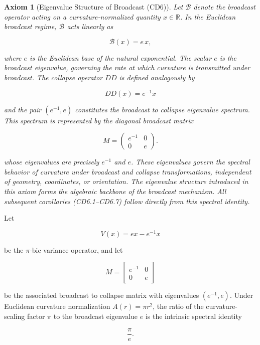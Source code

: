 \documentclass[final,onefignum,onetabnum]{siamart}
\newtheorem{axiom}{Axiom}
\begin{document}
\begin{axiom}[Eigenvalue Structure of Broadcast (CD6)]
Let $\mathcal{B}$ denote the broadcast operator acting on a curvature-normalized quantity $x \in \mathbb{R}$. In the Euclidean broadcast regime, $\mathcal{B}$ acts linearly as

\[
\mathcal{B}(x) = e\,x,
\]

where $e$ is the Euclidean base of the natural exponential. The scalar $e$ is the broadcast eigenvalue, governing the rate at which curvature is transmitted under broadcast. The collapse operator $DD$ is defined analogously by


\[
DD(x) = e^{-1} x
\]


and the pair $(e^{-1}, e)$ constitutes the broadcast to collapse eigenvalue spectrum. This spectrum is represented by the diagonal broadcast matrix


\[
M = \begin{pmatrix}
e^{-1} & 0 \\
0 & e
\end{pmatrix}.
\]


whose eigenvalues are precisely $e^{-1}$ and $e$. These eigenvalues govern the spectral behavior of curvature under broadcast and collapse transformations, independent of geometry, coordinates, or orientation. The eigenvalue structure introduced in this axiom forms the algebraic backbone of the broadcast mechanism. All subsequent corollaries (CD6.1–CD6.7) follow directly from this spectral identity.
\end{axiom}

\begin{corollary}
Let


\[
V(x) = e x - e^{-1} x
\]


be the $\pi$-bic variance operator, and let


\[
M =
\begin{bmatrix}
e^{-1} & 0 \\
0 & e
\end{bmatrix}
\]


be the associated broadcast to collapse matrix with eigenvalues $(e^{-1}, e)$. Under Euclidean curvature normalization $A(r) = \pi r^{2}$, the ratio of the curvature-scaling factor $\pi$ to the broadcast eigenvalue $e$ is the intrinsic spectral identity


\[
\frac{\pi}{e}.
\]

\end{corollary}
\end{document}
